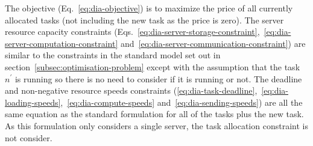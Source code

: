The objective (Eq.~\eqref{eq:dia-objective}) is to maximize the price of all currently allocated tasks (not including
the new task as the price is zero). The server resource capacity constraints
(Eqs.~\eqref{eq:dia-server-storage-constraint},~\eqref{eq:dia-server-computation-constraint}
and~\eqref{eq:dia-server-communication-constraint}) are similar to the constraints in the standard model set out in
section~\ref{subsec:optimisation-problem} except with the assumption that the task $n^{'}$ is running so there is no
need to consider if it is running or not. The deadline and non-negative resource speeds constraints
(\ref{eq:dia-task-deadline},~\ref{eq:dia-loading-speeds},~\ref{eq:dia-compute-speeds} and~\ref{eq:dia-sending-speeds})
are all the same equation as the standard formulation for all of the tasks plus the new task. As this formulation only
considers a single server, the task allocation constraint is not consider.

